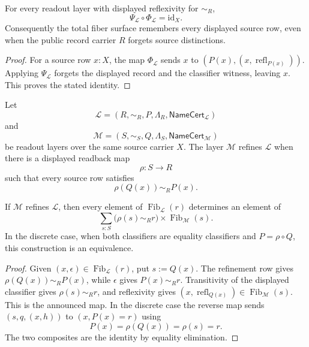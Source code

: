 \begin{theorem}
\label{thm:interface-displayed-source-readback}
For every readout layer with displayed reflexivity for $\sim_R$,
$$
\Psi_{\mathcal L}\circ\Phi_{\mathcal L}=\mathrm{id}_X.
$$
Consequently the total fiber surface remembers every displayed source
row, even when the public record carrier $R$ forgets source distinctions.
\end{theorem}

\begin{proof}
For a source row $x:X$, the map $\Phi_{\mathcal L}$ sends $x$ to
$(P(x),(x,\operatorname{refl}_{P(x)}))$. Applying $\Psi_{\mathcal L}$
forgets the displayed record and the classifier witness, leaving $x$.
This proves the stated identity.
\end{proof}

\begin{definition}
\label{def:interface-readout-refinement}
Let
$$
\mathcal L=(R,\sim_R,P,\Lambda_R,\mathsf{NameCert}_{\mathcal L})
$$
and
$$
\mathcal M=(S,\sim_S,Q,\Lambda_S,\mathsf{NameCert}_{\mathcal M})
$$
be readout layers over the same source carrier $X$. The layer
$\mathcal M$ refines $\mathcal L$ when there is a displayed readback map
$$
\rho:S\to R
$$
such that every source row satisfies
$$
\rho(Q(x))\sim_R P(x).
$$
\end{definition}

\begin{theorem}
\label{thm:interface-refinement-partitions-previous-fiber}
If $\mathcal M$ refines $\mathcal L$, then every element of
$\operatorname{Fib}_{\mathcal L}(r)$ determines an element of
$$
\sum_{s:S}
\bigl(\rho(s)\sim_R r\bigr)\times
\operatorname{Fib}_{\mathcal M}(s).
$$
In the discrete case, when both classifiers are equality classifiers and
$P=\rho\circ Q$, this construction is an equivalence.
\end{theorem}

\begin{proof}
Given $(x,\epsilon)\in\operatorname{Fib}_{\mathcal L}(r)$, put
$s:=Q(x)$. The refinement row gives $\rho(Q(x))\sim_R P(x)$, while
$\epsilon$ gives $P(x)\sim_R r$. Transitivity of the displayed
classifier gives $\rho(s)\sim_R r$, and reflexivity gives
$(x,\operatorname{refl}_{Q(x)})\in\operatorname{Fib}_{\mathcal M}(s)$.
This is the announced map. In the discrete case the reverse map sends
$(s,q,(x,h))$ to $(x,P(x)=r)$ using
$$
P(x)=\rho(Q(x))=\rho(s)=r.
$$
The two composites are the identity by equality elimination.
\end{proof}

